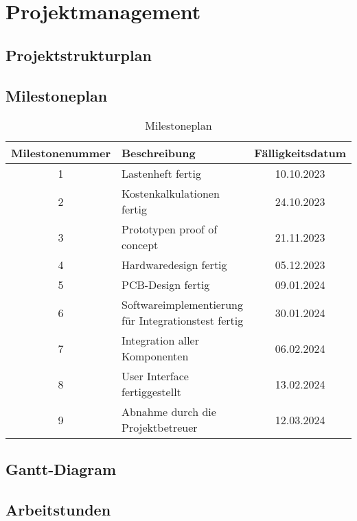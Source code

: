 \documentclass[titlepage,12pt,twoside]{article}
\begin{document}
\newpage
\section{Projektmanagement}
\subsection{Projektstrukturplan}

\subsection{Milestoneplan}
\begin{table}[H]
    \centering
    \begin{tabular}{|c|l|c|}  %
        \hline
        \textbf{Milestonenummer} & \textbf{Beschreibung} & \textbf{Fälligkeitsdatum} \\
        \hline
        1 & Lastenheft fertig & 10.10.2023 \\
		\hline
        2 & Kostenkalkulationen fertig & 24.10.2023 \\
		\hline
        3 & Prototypen proof of concept & 21.11.2023 \\
		\hline
        4 & Hardwaredesign fertig & 05.12.2023 \\
		\hline
        5 & PCB-Design fertig & 09.01.2024 \\
		\hline
        6 & Softwareimplementierung für Integrationstest fertig & 30.01.2024 \\
		\hline
        7 & Integration aller Komponenten & 06.02.2024 \\
		\hline
        8 & User Interface fertiggestellt & 13.02.2024 \\
		\hline
        9 & Abnahme durch die Projektbetreuer & 12.03.2024 \\
        \hline
    \end{tabular}
    \caption{Milestoneplan}
    \label{tab:Milestoneplan}
\end{table}

\subsection{Gantt-Diagram}

\newpage
\subsection{Arbeitstunden}
\end{document}
